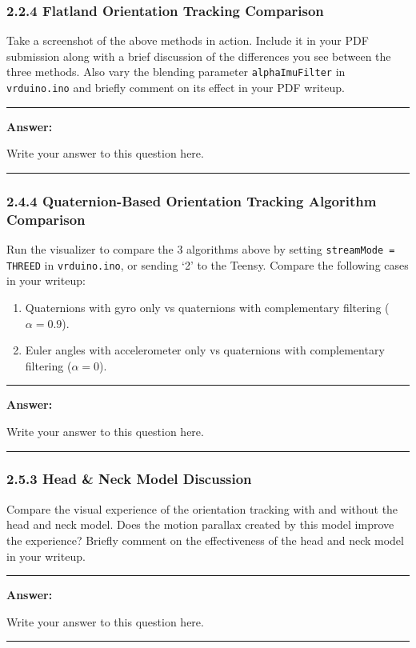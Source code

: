\documentclass[conference]{styles/acmsiggraph}
\newenvironment{answer}{}{}
\begin{document}
\subsubsection*{2.2.4 Flatland Orientation Tracking Comparison} 
Take a screenshot of the above methods in action. Include it in your PDF submission along with a brief discussion of the differences you see between the three methods. Also vary the blending parameter \texttt{alphaImuFilter} in \texttt{vrduino.ino} and briefly comment on its effect in your PDF writeup. 

\begin{answer}
\rule{\textwidth}{0.4pt}
	
	\textbf{Answer:}
	
	Write your answer to this question here.

\rule{\textwidth}{0.4pt}
\end{answer}

\subsubsection*{2.4.4 Quaternion-Based Orientation Tracking Algorithm Comparison} 
Run the visualizer to compare the 3 algorithms above by setting \texttt{streamMode = THREED} in \texttt{vrduino.ino}, or sending `2' to the Teensy. Compare the following cases in your writeup:
\begin{enumerate}
\item Quaternions with gyro only vs quaternions with complementary filtering ($\alpha = 0.9$).
\item Euler angles with accelerometer only vs quaternions with complementary filtering ($\alpha = 0$).
\end{enumerate}

\begin{answer}
\rule{\textwidth}{0.4pt}
	
	\textbf{Answer:}
	
	Write your answer to this question here.

\rule{\textwidth}{0.4pt}
\end{answer}

\subsubsection*{2.5.3 Head \& Neck Model Discussion} 
Compare the visual experience of the orientation tracking with and without the head and neck model. Does the motion parallax created by this model improve the experience? Briefly comment on the effectiveness of the head and neck model in your writeup.

\begin{answer}
\rule{\textwidth}{0.4pt}
	
	\textbf{Answer:}
	
	Write your answer to this question here.

\rule{\textwidth}{0.4pt}
\end{answer}
\end{document}
